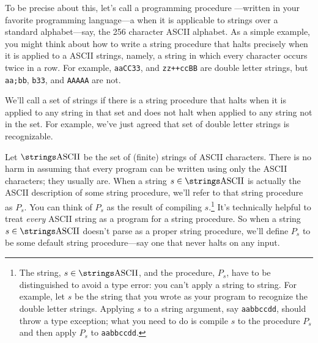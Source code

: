 To be precise about this, let's call a programming procedure
---written in your favorite programming language\iffalse such as C++, or Java,
or Python\fi---a  when it is applicable to
strings over a standard alphabet---say, the 256 character ASCII
alphabet.  \iffalse When a string procedure applied to an ASCII string
halts, we'll say the procedure halts on the string.  If it runs
forever, then we'll say does not halt on the string.\fi As a simple
example, you might think about how to write a string procedure that
halts precisely when it is applied to a  ASCII
strings, namely, a string in which every character occurs twice in a
row.  For example, \texttt{aaCC33}, and \texttt{zz++ccBB} are double
letter strings, but \texttt{aa;bb}, \texttt{b33}, and \texttt{AAAAA}
are not.

We'll call a set of strings  if there is a string
procedure that halts when it is applied to any string in that set and
does not halt when applied to any string not in the set.  For example,
we've just agreed that set of double letter strings is recognizable.

Let $\asciistr$ be the set of (finite) strings of ASCII characters.
There is no harm in assuming that every program can be written using
only the ASCII characters; they usually are.  When a string $s
\in \asciistr$ is actually the ASCII description of some string
procedure, we'll refer to that string procedure as $P_s$.  You can
think of $P_s$ as the result of compiling $s$.\footnote{The string, $s
  \in \asciistr$, and the procedure, $P_s$, have to be distinguished
  to avoid a type error: you can't apply a string to string.  For
  example, let $s$ be the string that you wrote as your program to
  recognize the double letter strings.  Applying $s$ to a string
  argument, say \texttt{aabbccdd}, should throw a type exception; what
  you need to do is compile $s$ to the procedure $P_s$ and then apply
  $P_s$ to \texttt{aabbccdd}.  \iffalse This application should result
  in a halting computation, since \texttt{aabbccdd} is a double letter
  string.\fi } It's technically helpful to treat \emph{every} ASCII
string as a program for a string procedure.  So when a string $s \in
\asciistr$ doesn't parse as a proper string procedure, we'll define
$P_s$ to be some default string procedure---say one that never halts
on any input.  \iffalse So if $s$ is an ill-formed string, $P_S$ will
be a recognizer for the empty set of strings.  \fi

